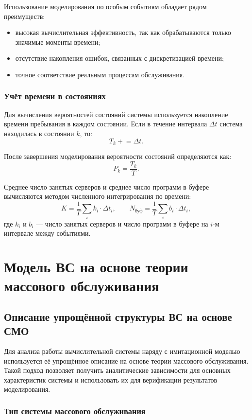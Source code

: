 \documentclass[14pt,a4paper]{extarticle}
\begin{document}
Использование моделирования по особым событиям обладает рядом преимуществ:
\begin{itemize}
  \item высокая вычислительная эффективность, так как обрабатываются только
        значимые моменты времени;
  \item отсутствие накопления ошибок, связанных с дискретизацией времени;
  \item точное соответствие реальным процессам обслуживания.
\end{itemize}

\subsubsection*{Учёт времени в состояниях}

Для вычисления вероятностей состояний системы используется накопление времени
пребывания в каждом состоянии. Если в течение интервала $\Delta t$ система
находилась в состоянии $k$, то:
\[
  T_k \mathrel{+}= \Delta t.
\]

После завершения моделирования вероятности состояний определяются как:
\[
  P_k = \frac{T_k}{T}.
\]

Среднее число занятых серверов и среднее число программ в буфере вычисляются
методом численного интегрирования по времени:
\[
  K = \frac{1}{T}\sum_i k_i \cdot \Delta t_i, \qquad
  N_{\text{буф}} = \frac{1}{T}\sum_i b_i \cdot \Delta t_i,
\]
где $k_i$ и $b_i$ --- число занятых серверов и число программ в буфере на
$i$-м интервале между событиями.

\newpage
\section{Модель ВС на основе теории массового обслуживания}

\subsection{Описание упрощённой структуры ВС на основе СМО}

Для анализа работы вычислительной системы наряду с имитационной моделью
используется её упрощённое описание на основе теории массового обслуживания.
Такой подход позволяет получить аналитические зависимости для основных
характеристик системы и использовать их для верификации результатов моделирования.

\subsubsection*{Тип системы массового обслуживания}
\end{document}
